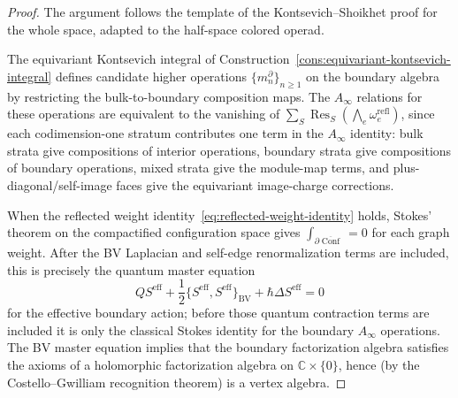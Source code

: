 \begin{proof}
The argument follows the template of the Kontsevich--Shoikhet proof for the
whole space, adapted to the half-space colored operad.

The equivariant Kontsevich integral of
Construction~\ref{cons:equivariant-kontsevich-integral} defines candidate
higher operations $\{m_n^{\partial}\}_{n\ge 1}$ on the boundary algebra by
restricting the bulk-to-boundary composition maps. The $A_\infty$ relations
for these operations are equivalent to the vanishing of
$\sum_S \operatorname{Res}_S(\bigwedge_e \omega_e^{\mathrm{refl}})$, since
each codimension-one stratum contributes one term in the $A_\infty$ identity:
bulk strata give compositions of interior operations, boundary strata give
compositions of boundary operations, mixed strata give the module-map terms,
and plus-diagonal/self-image faces give the equivariant image-charge
corrections.

When the reflected weight identity~\eqref{eq:reflected-weight-identity} holds,
Stokes' theorem on the compactified configuration space gives
$\int_{\partial\overline{\operatorname{Conf}}} = 0$
for each graph weight. After the BV Laplacian and self-edge
renormalization terms are included, this is precisely the quantum
master equation
\[
 Q S^{\mathrm{eff}}
 +\frac12\{S^{\mathrm{eff}},S^{\mathrm{eff}}\}_{\mathrm{BV}}
 +\hbar\Delta S^{\mathrm{eff}}=0
\]
for the effective boundary action; before those quantum contraction
terms are included it is only the classical Stokes identity for the
boundary $A_\infty$ operations. The BV master equation implies that the
boundary factorization algebra satisfies the axioms of a holomorphic
factorization algebra on $\mathbb C\times\{0\}$, hence (by the
Costello--Gwilliam recognition theorem) is a vertex algebra.
\end{proof}

